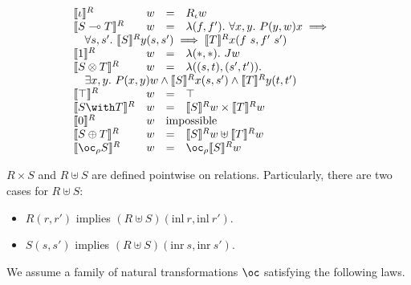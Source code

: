 \begin{displaymath}
  \begin{array}{llll}
    \llbracket \base \rrbracket^R & w & = & R_\base w \\
    \llbracket \fun{S}{T} \rrbracket^R & w & = & \lambda (f, f').~\forall x,y.~P(y,w)x \implies \phantom{X} \\
    \quad \forall s,s'.~\llbracket S \rrbracket^R y (s, s') \implies \llbracket
    T \rrbracket^R x (f~s, f'~s') \span \span \span \\
    \llbracket \tensorOne \rrbracket^R & w & = & \lambda (*, *).~J w \\
    \llbracket \tensor{S}{T} \rrbracket^R & w & = & \lambda ((s, t), (s', t')). \\
    \quad \exists x,y.~P(x,y)w \wedge \llbracket S \rrbracket^R x (s, s') \wedge
    \llbracket T \rrbracket^R y (t, t') \span \span \span \\
    \llbracket \withTOne \rrbracket^R & w & = & \top \\
    \llbracket \withT{S}{T} \rrbracket^R & w & = & \llbracket S \rrbracket^R w \times \llbracket T \rrbracket^R w \\
    \llbracket \sumTZero \rrbracket^R & w & \mathrm{impossible} \span \\
    \llbracket \sumT{S}{T} \rrbracket^R & w & = & \llbracket S \rrbracket^R w \uplus \llbracket T \rrbracket^R w \\
    \llbracket \excl{\rho}{S} \rrbracket^R & w & = & \oc_\rho \llbracket S
                                                   \rrbracket^R w \\
  \end{array}
\end{displaymath}

$R \times S$ and $R \uplus S$ are defined pointwise on relations.
Particularly, there are two cases for $R \uplus S$:

\begin{itemize}
  \item $R(r, r')$ implies $(R \uplus S)(\mathrm{inl}~r, \mathrm{inl}~r')$.
  \item $S(s, s')$ implies $(R \uplus S)(\mathrm{inr}~s, \mathrm{inr}~s')$.
\end{itemize}

We assume a family of natural transformations $\oc$ satisfying the following laws.


